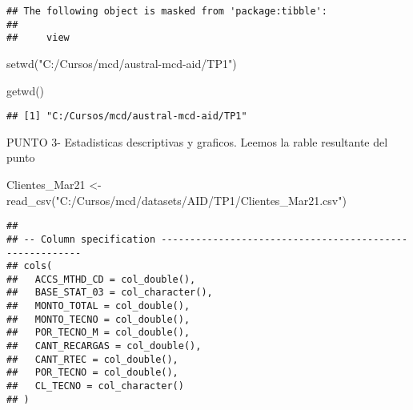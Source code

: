 \documentclass[
]{article}
\newenvironment{Shaded}{\begin{snugshade}}{\end{snugshade}}
\newcommand{\CommentTok}[1]{\textcolor[rgb]{0.56,0.35,0.01}{\textit{#1}}}
\newcommand{\FunctionTok}[1]{\textcolor[rgb]{0.00,0.00,0.00}{#1}}
\newcommand{\NormalTok}[1]{#1}
\newcommand{\OtherTok}[1]{\textcolor[rgb]{0.56,0.35,0.01}{#1}}
\newcommand{\SpecialCharTok}[1]{\textcolor[rgb]{0.00,0.00,0.00}{#1}}
\newcommand{\StringTok}[1]{\textcolor[rgb]{0.31,0.60,0.02}{#1}}
\begin{document}
\begin{verbatim}
## The following object is masked from 'package:tibble':
## 
##     view
\end{verbatim}

\begin{Shaded}
\begin{Highlighting}[]
\FunctionTok{setwd}\NormalTok{(}\StringTok{"C:/Cursos/mcd/austral{-}mcd{-}aid/TP1"}\NormalTok{)}

\FunctionTok{getwd}\NormalTok{()}
\end{Highlighting}
\end{Shaded}

\begin{verbatim}
## [1] "C:/Cursos/mcd/austral-mcd-aid/TP1"
\end{verbatim}

PUNTO 3- Estadisticas descriptivas y graficos. Leemos la rable
resultante del punto

\begin{Shaded}
\begin{Highlighting}[]
\NormalTok{Clientes\_Mar21 }\OtherTok{\textless{}{-}} \FunctionTok{read\_csv}\NormalTok{(}\StringTok{"C:/Cursos/mcd/datasets/AID/TP1/Clientes\_Mar21.csv"}\NormalTok{)}
\end{Highlighting}
\end{Shaded}

\begin{verbatim}
## 
## -- Column specification --------------------------------------------------------
## cols(
##   ACCS_MTHD_CD = col_double(),
##   BASE_STAT_03 = col_character(),
##   MONTO_TOTAL = col_double(),
##   MONTO_TECNO = col_double(),
##   POR_TECNO_M = col_double(),
##   CANT_RECARGAS = col_double(),
##   CANT_RTEC = col_double(),
##   POR_TECNO = col_double(),
##   CL_TECNO = col_character()
## )
\end{verbatim}

\begin{Shaded}
\end{Shaded}
\end{document}
